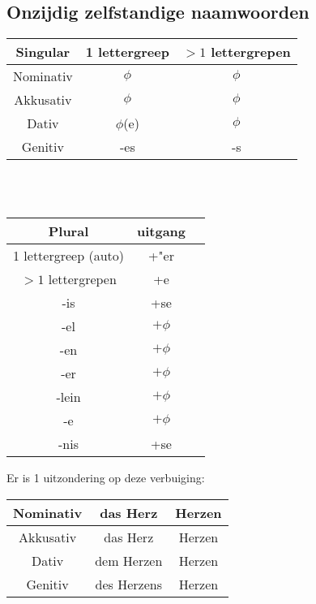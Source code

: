 \documentclass[main.tex]{subfiles}
\begin{document}
\subsection{Onzijdig zelfstandige naamwoorden}
\begin{minipage}[t]{0.5\textwidth}
\begin{tabular}{|c|c|c|}
\hline 
\rowcolor{gray}
Singular & 1 lettergreep & $>1$ lettergrepen \\ 
\hline 
\cellcolor[gray]{0.8}Nominativ & $\phi$ & $\phi$\\ 
\hline 
\cellcolor[gray]{0.8}Akkusativ & $\phi$ & $\phi$\\ 
\hline 
\cellcolor[gray]{0.8}Dativ & $\phi$(e) & $\phi$ \\ 
\hline 
\cellcolor[gray]{0.8}Genitiv & -es & -s \\ 
\hline 
\end{tabular} 
\\
\\
\begin{tabular}{|c|c|c|}
\hline 
\rowcolor{gray}
Plural & uitgang \\ 
\hline 
\cellcolor[gray]{0.8}1 lettergreep (auto) & +"er \\ 
\hline 
\cellcolor[gray]{0.8} $>1$ lettergrepen & +e \\ 
\hline 
\cellcolor[gray]{0.8} -is & +se \\ 
\hline 
\cellcolor[gray]{0.8} -el & $+\phi$ \\ 
\hline 
\cellcolor[gray]{0.8} -en & $+\phi$ \\ 
\hline 
\cellcolor[gray]{0.8} -er & $+\phi$ \\ 
\hline 
\cellcolor[gray]{0.8} -lein & $+\phi$ \\ 
\hline 
\cellcolor[gray]{0.8} -e & $+\phi$ \\ 
\hline 
\cellcolor[gray]{0.8} -nis & +se \\ 
\hline 
\end{tabular} 
\end{minipage}
\begin{minipage}{0.5\textwidth}
Er is 1 uitzondering op deze verbuiging:\\
\begin{tabular}{|c|c|c|}
\hline 
\cellcolor[gray]{0.8}Nominativ & das Herz & Herzen\\ 
\hline 
\cellcolor[gray]{0.8}Akkusativ & das Herz & Herzen\\ 
\hline 
\cellcolor[gray]{0.8}Dativ & dem Herzen & Herzen\\ 
\hline 
\cellcolor[gray]{0.8}Genitiv & des Herzens & Herzen\\ 
\hline 
\end{tabular}
\end{minipage}
\end{document}
